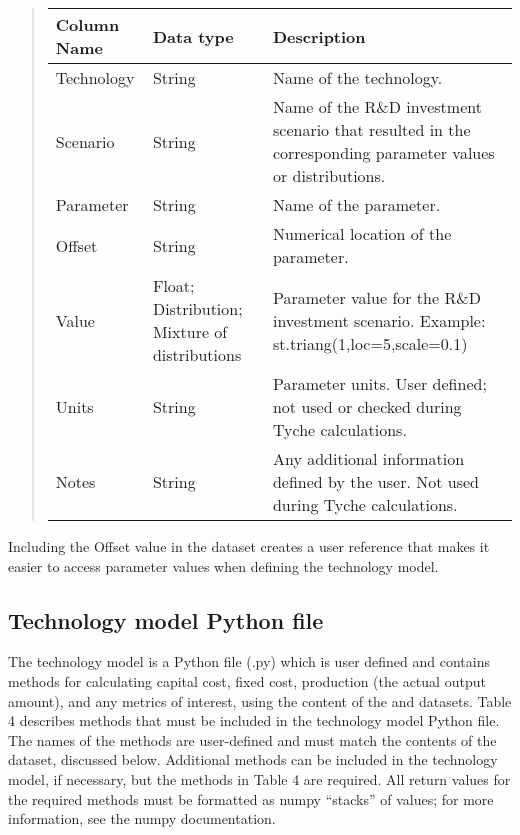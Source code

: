 \documentclass[letterpaper,10pt,english]{sphinxmanual}
\begin{document}
\begin{quote}


\begin{savenotes}\sphinxattablestart
\centering
\begin{tabulary}{\linewidth}[t]{|T|T|T|}
\hline
\sphinxstyletheadfamily 
Column Name
&\sphinxstyletheadfamily 
Data type
&\sphinxstyletheadfamily 
Description
\\
\hline
Technology
&
String
&
Name of the technology.
\\
\hline
Scenario
&
String
&
Name of the R\&D investment scenario that resulted in the corresponding parameter values or distributions.
\\
\hline
Parameter
&
String
&
Name of the parameter.
\\
\hline
Offset
&
String
&
Numerical location of the parameter.
\\
\hline
Value
&
Float; Distribution; Mixture of distributions
&
Parameter value for the R\&D investment scenario. Example: st.triang(1,loc=5,scale=0.1)
\\
\hline
Units
&
String
&
Parameter units. User defined; not used or checked during Tyche calculations.
\\
\hline
Notes
&
String
&
Any additional information defined by the user. Not used during Tyche calculations.
\\
\hline
\end{tabulary}
\par
\sphinxattableend\end{savenotes}
\end{quote}

Including the Offset value in the  dataset creates a user reference that makes it easier to access parameter values when defining the technology model.


\subsection{Technology model Python file}
\label{\detokenize{cheat-sheet:technology-model-python-file}}
The technology model is a Python file (.py) which is user defined and contains methods for calculating capital cost, fixed cost, production (the actual output amount), and any metrics of interest, using the content of the  and  datasets. Table 4 describes methods that must be included in the technology model Python file. The names of the methods are user-defined and must match the contents of the  dataset, discussed below. Additional methods can be included in the technology model, if necessary, but the methods in Table 4 are required. All return values for the required methods must be formatted as numpy “stacks” of values; for more information, see the numpy documentation.
\end{document}
